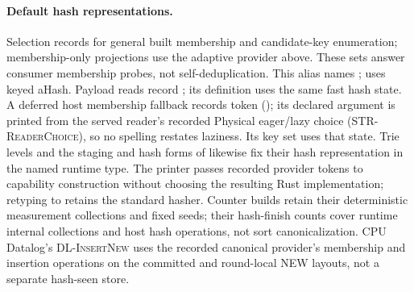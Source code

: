\paragraph{Default hash representations.} Selection records
 for general built membership and candidate-key
enumeration; membership-only projections use the adaptive provider above.
These sets answer consumer membership probes, not self-deduplication.
This alias names
;
 uses keyed aHash. Payload reads record
; its definition uses the same fast
hash state. A deferred host membership fallback records token 
(); its declared 
argument is printed from the served reader's recorded Physical eager/lazy
choice (\textsc{STR-ReaderChoice}), so no spelling restates laziness. Its
key set uses that state. Trie levels and the staging and hash forms of
 likewise fix their hash representation in the named
runtime type. The printer passes recorded provider tokens to capability
construction without choosing the resulting Rust implementation; retyping to
 retains the standard hasher.
Counter builds retain their deterministic measurement collections and fixed
seeds; their hash-finish counts cover runtime internal collections and host
hash operations, not sort canonicalization. CPU Datalog's
\textsc{DL-InsertNew} uses the recorded canonical provider's membership and
insertion operations on the committed and round-local NEW layouts, not a
separate hash-seen store.

